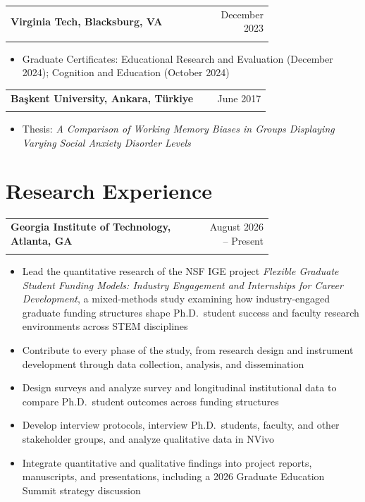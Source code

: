 \documentclass[letterpaper,11pt]{article}
\makeatletter
\newcommand{\entry}[3]{%
  \begin{tabular*}{\linewidth}[t]{@{}>{\raggedright\arraybackslash}p{0.74\linewidth}@{\extracolsep{\fill}}r@{}}
    \textbf{#1} & #2 \\
    \multicolumn{2}{@{}l@{}}{\textit{#3}} \\
  \end{tabular*}\par\vspace{1pt}}
\newenvironment{bullets}%
  {\begin{itemize}[leftmargin=1.2em, itemsep=1pt, parsep=0pt, topsep=1pt, label=\textbullet]}%
  {\end{itemize}\vspace{4pt}}
\makeatother
\begin{document}
\entry{Virginia Tech, Blacksburg, VA}{December 2023}
      {Master of Arts in Education in Curriculum and Instruction, Educational Psychology}
\begin{bullets}
  \item Graduate Certificates: Educational Research and Evaluation (December 2024); Cognition and Education (October 2024)
\end{bullets}

\entry{Başkent University, Ankara, Türkiye}{June 2017}
      {Bachelor of Arts in Psychology}
\begin{bullets}
  \item Thesis: \textit{A Comparison of Working Memory Biases in Groups Displaying Varying Social Anxiety Disorder Levels}
\end{bullets}

\section{Research Experience}
\entry{Georgia Institute of Technology, Atlanta, GA}{August 2026 -- Present}
      {Postdoctoral Fellow, NSF Innovations in Graduate Education (IGE) Project}
\begin{bullets}
  \item Lead the quantitative research of the NSF IGE project \textit{Flexible Graduate Student Funding Models: Industry Engagement and Internships for Career Development}, a mixed-methods study examining how industry-engaged graduate funding structures shape Ph.D.\ student success and faculty research environments across STEM disciplines
  \item Contribute to every phase of the study, from research design and instrument development through data collection, analysis, and dissemination
  \item Design surveys and analyze survey and longitudinal institutional data to compare Ph.D.\ student outcomes across funding structures
  \item Develop interview protocols, interview Ph.D.\ students, faculty, and other stakeholder groups, and analyze qualitative data in NVivo
  \item Integrate quantitative and qualitative findings into project reports, manuscripts, and presentations, including a 2026 Graduate Education Summit strategy discussion
\end{bullets}
\end{document}
